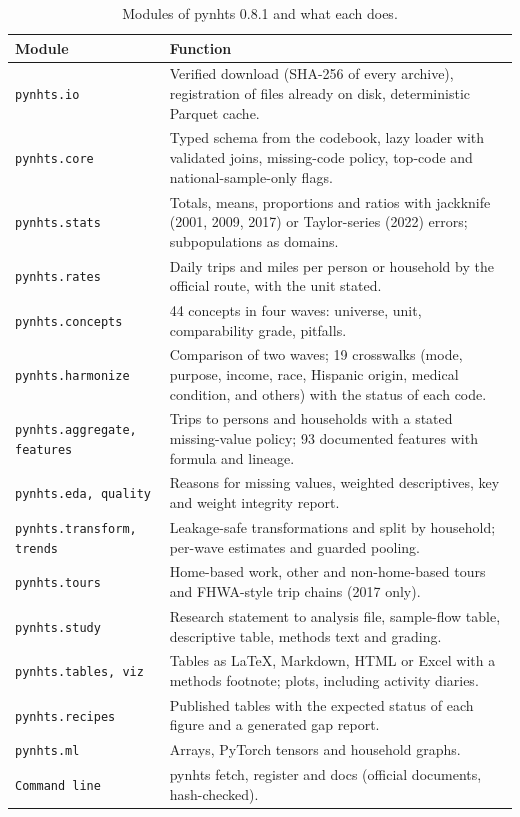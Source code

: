 \documentclass[preprint,12pt, a4paper]{elsarticle}
\begin{document}
\begin{enumerate}
\begin{enumerate}
\begin{table}[!ht]
\centering\small
\caption{Modules of pynhts 0.8.1 and what each does.}
\label{tab:modules}
\begin{tabular}{@{}p{3.7cm}p{11.0cm}@{}}
\hline
\textbf{Module} & \textbf{Function} \\
\hline
\texttt{pynhts.io} & Verified download (SHA-256 of every archive), registration of files already on disk, deterministic Parquet cache. \\
\texttt{pynhts.core} & Typed schema from the codebook, lazy loader with validated joins, missing-code policy, top-code and national-sample-only flags. \\
\texttt{pynhts.stats} & Totals, means, proportions and ratios with jackknife (2001, 2009, 2017) or Taylor-series (2022) errors; subpopulations as domains. \\
\texttt{pynhts.rates} & Daily trips and miles per person or household by the official route, with the unit stated. \\
\texttt{pynhts.concepts} & 44 concepts in four waves: universe, unit, comparability grade, pitfalls. \\
\texttt{pynhts.harmonize} & Comparison of two waves; 19 crosswalks (mode, purpose, income, race, Hispanic origin, medical condition, and others) with the status of each code. \\
\texttt{pynhts.aggregate, features} & Trips to persons and households with a stated missing-value policy; 93 documented features with formula and lineage. \\
\texttt{pynhts.eda, quality} & Reasons for missing values, weighted descriptives, key and weight integrity report. \\
\texttt{pynhts.transform, trends} & Leakage-safe transformations and split by household; per-wave estimates and guarded pooling. \\
\texttt{pynhts.tours} & Home-based work, other and non-home-based tours and FHWA-style trip chains (2017 only). \\
\texttt{pynhts.study} & Research statement to analysis file, sample-flow table, descriptive table, methods text and grading. \\
\texttt{pynhts.tables, viz} & Tables as LaTeX, Markdown, HTML or Excel with a methods footnote; plots, including activity diaries. \\
\texttt{pynhts.recipes} & Published tables with the expected status of each figure and a generated gap report. \\
\texttt{pynhts.ml} & Arrays, PyTorch tensors and household graphs. \\
\texttt{Command line} & pynhts fetch, register and docs (official documents, hash-checked). \\
\hline
\end{tabular}
\end{table}
\end{enumerate}


\end{enumerate}
\end{document}
